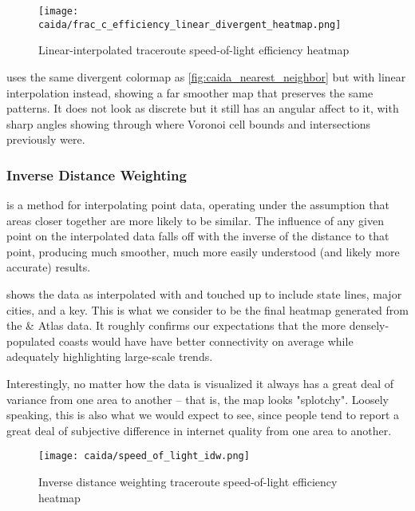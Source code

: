 \begin{figure}[htb]
    \centering
    \texttt{[image: caida/frac\_c\_efficiency\_linear\_divergent\_heatmap.png]}
    \caption{Linear-interpolated traceroute speed-of-light efficiency heatmap}
    \label{fig:caida_linear_interpolation}
\end{figure}

 uses the same divergent colormap as \cref{fig:caida_nearest_neighbor} but with linear interpolation instead, showing a far smoother map that preserves the same patterns. It does not look as discrete but it still has an angular affect to it, with sharp angles showing through where Voronoi cell bounds and intersections previously were.

\subsubsection{Inverse Distance Weighting}

\IDW is a method for interpolating point data, operating under the assumption that areas closer together are more likely to be similar. The influence of any given point on the interpolated data falls off with the inverse of the distance to that point, producing much smoother, much more easily understood (and likely more accurate) results.

 shows the data as interpolated with \idw and touched up to include state lines, major cities, and a key. This is what we consider to be the final heatmap generated from the \caida \& \ripe Atlas data. It roughly confirms our expectations that the more densely-populated coasts would have have better connectivity on average while adequately highlighting large-scale trends.

Interestingly, no matter how the data is visualized it always has a great deal of variance from one area to another -- that is, the map looks "splotchy". Loosely speaking, this is also what we would expect to see, since people tend to report a great deal of subjective difference in internet quality from one area to another.

\begin{figure}[htb]
    \centering
    \texttt{[image: caida/speed\_of\_light\_idw.png]}
    \caption{Inverse distance weighting traceroute speed-of-light efficiency heatmap}
    \label{fig:caida_idw_heatmap}
\end{figure}

